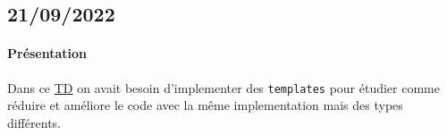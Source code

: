 \documentclass{article}
\begin{document}
\newpage\subsection{21/09/2022}
\paragraph{Présentation}Dans ce \href{https://perso.ensta-paris.fr/~bmonsuez/Cours/doku.php?id=in204:seances:seance3}{TD} on avait besoin d'implementer des \texttt{templates} pour étudier comme réduire et améliore le code avec la même implementation mais des types différents.
\begin{scriptsize}
    \mycode
    
\end{scriptsize}
\begin{scriptsize}
    \mycode
    
\end{scriptsize}
\end{document}
